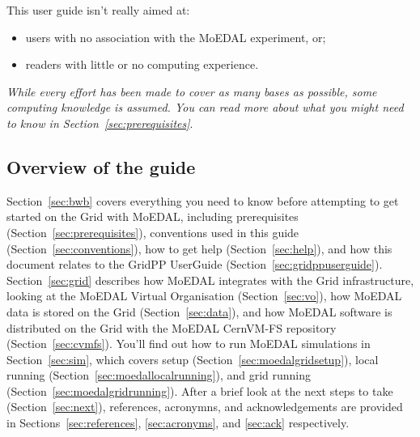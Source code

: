 This user guide isn't really aimed at:

\begin{itemize}
\item users with no association with the \ac{MoEDAL} experiment, or;
\item readers with little or no computing experience.
\end{itemize}

\begin{tcolorbox}[title=Computing knowledge]
\emph{While every effort has been made to cover as many
bases as possible, some computing knowledge is
assumed. You can read more about what you might need to know in
Section~\ref{sec:prerequisites}}.
\end{tcolorbox}

\newpage

\subsection{Overview of the guide}
\label{sec:overview}
Section~\ref{sec:bwb} covers everything you need to know before
attempting to get started on the Grid with MoEDAL, including
prerequisites (Section~\ref{sec:prerequisites}),
conventions used in this guide (Section~\ref{sec:conventions}),
how to get help (Section~\ref{sec:help}),
and
how this document relates to the GridPP UserGuide (Section~\ref{sec:gridppuserguide}).
%
Section~\ref{sec:grid} describes how MoEDAL integrates with the Grid
infrastructure, looking at the MoEDAL Virtual Organisation (Section~\ref{sec:vo}),
how MoEDAL data is stored on the Grid (Section~\ref{sec:data}),
and
how MoEDAL software is distributed on the Grid with the
MoEDAL CernVM-FS repository (Section~\ref{sec:cvmfs}).
%
You'll find out how to run MoEDAL simulations in
Section~\ref{sec:sim},
which covers setup (Section~\ref{sec:moedalgridsetup}),
local running (Section~\ref{sec:moedallocalrunning}),
and
grid running (Section~\ref{sec:moedalgridrunning}).
%
After a brief look at the next steps to take (Section~\ref{sec:next}),
references, acronymns, and acknowledgements are provided in
Sections~\ref{sec:references}, \ref{sec:acronyms}, and
\ref{sec:ack} respectively.
